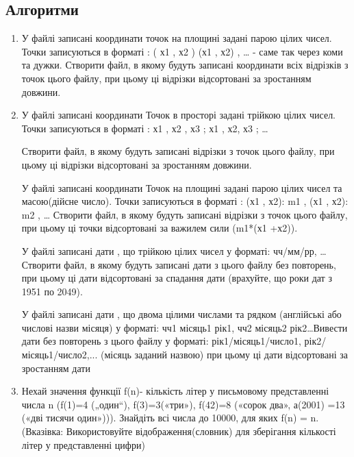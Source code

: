 \documentclass[]{article}
\begin{document}
\subsection{Алгоритми}


\begin{enumerate}

\def\labelenumi{\arabic{enumi}.}
\item

У файлі записані координати точок
на площині задані парою цілих чисел. Точки записуються в форматі : ( х1
, х2 ) (х1 , х2) , \ldots{} - саме так через коми та дужки. Створити
файл, в якому будуть записані координати всіх відрізків з точок цього
файлу, при цьому ці відрізки відсортовані за зростанням довжини.

\item У файлі записані координати Точок
в просторі задані трійкою цілих чисел. Точки записуються в форматі : х1
, х2 , х3 ; х1 , х2, х3 ; \ldots{}

Створити файл, в якому будуть записані відрізки з точок цього файлу, при
цьому ці відрізки відсортовані за зростанням довжини.

У файлі записані координати Точок на площині задані парою цілих чисел та
масою(дійсне число). Точки записуються в форматі : (х1 , х2): m1 , (х1 ,
х2): m2 , \ldots{} Створити файл, в якому будуть записані відрізки з
точок цього файлу, при цьому ці точки відсортовані за важилем сили
(m1*(х1 +х2)).

У файлі записані дати , що трійкою цілих чисел у форматі: чч/мм/рр,
\ldots{} Створити файл, в якому будуть записані дати з цього файлу без
повторень, при цьому ці дати відсортовані за спадання дати (врахуйте, що
роки дат з 1951 по 2049).

У файлі записані дати , що двома цілими числами та рядком (англійські
або числові назви місяця) у форматі: чч1 місяць1 рік1, чч2 місяць2
рік2\ldots{}Вивести дати без повторень з цього файлу у форматі:
рік1/місяць1/число1, рік2/місяць1/число2,... (місяць заданий назвою) при
цьому ці дати відсортовані за зростанням дати

\item

Нехай значення функції f(n)- кількість літер у письмовому представленні
числа n (f(1)=4 („один``), f(3)=3(«три»), f(42)=8 («сорок два», а(2001)
=13 («дві тисячи один»))). Знайдіть всі числа до 10000, для яких f(n) =
n. (Вказівка: Використовуйте відображення(словник) для зберігання
кількості літер у представленні цифри)


\end{enumerate}
\end{document}

